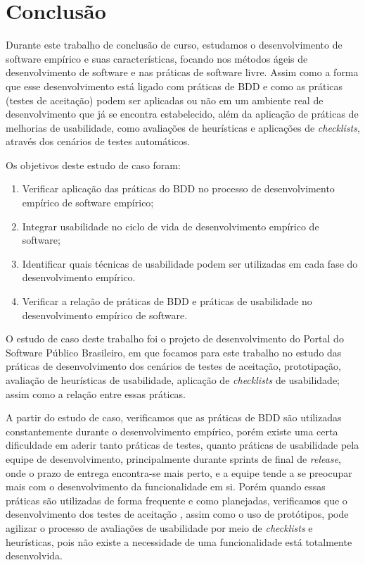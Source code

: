 \chapter{Conclusão}
\label{consideracoes-finais}

Durante este trabalho de conclusão de curso, estudamos o desenvolvimento de software empírico e suas características, focando nos métodos ágeis de desenvolvimento de software e nas práticas de software livre. Assim como a forma que esse desenvolvimento está ligado com práticas de BDD e como as práticas (testes de aceitação) podem ser aplicadas ou não em um ambiente real de desenvolvimento que já se encontra estabelecido, além da aplicação de práticas de melhorias de usabilidade, como avaliações de heurísticas e aplicações de \textit{checklists}, através dos cenários de testes automáticos.

Os objetivos deste estudo de caso foram:
\begin{enumerate}
\item Verificar aplicação das práticas do BDD no processo de desenvolvimento empírico de software empírico;
\item Integrar usabilidade no ciclo de vida de desenvolvimento empírico de software;
\item Identificar quais técnicas de usabilidade  podem ser utilizadas em cada fase do desenvolvimento empírico.
\item Verificar a relação de práticas de BDD e práticas de usabilidade no desenvolvimento empírico de software.
\end{enumerate}

O estudo de caso deste trabalho foi o projeto de desenvolvimento do Portal do Software Público Brasileiro, em que focamos para este trabalho no estudo das práticas de desenvolvimento dos cenários de testes de aceitação, prototipação, avaliação de heurísticas de usabilidade, aplicação de \textit{checklists} de usabilidade; assim como a relação entre essas práticas.

A partir do estudo de caso, verificamos que as práticas de BDD são utilizadas constantemente durante o desenvolvimento empírico, porém existe uma certa dificuldade em aderir tanto práticas de testes, quanto práticas de usabilidade pela equipe de desenvolvimento, principalmente durante sprints de final de \textit{release}, onde o prazo de entrega encontra-se mais perto, e a equipe tende a se preocupar mais com o desenvolvimento da funcionalidade em si. Porém quando essas práticas são utilizadas de forma frequente e como planejadas, verificamos que o desenvolvimento dos testes de aceitação , assim como o uso de protótipos, pode agilizar o processo de avaliações de usabilidade por meio de \textit{checklists} e heurísticas, pois não existe a necessidade de uma funcionalidade está totalmente desenvolvida. 

